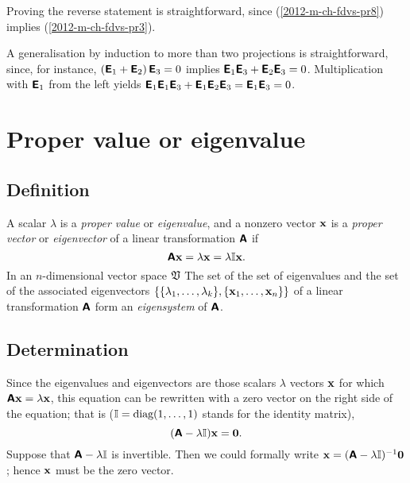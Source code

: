 {Proving the reverse statement is straightforward, since (\ref{2012-m-ch-fdvs-pr8}) implies  (\ref{2012-m-ch-fdvs-pr3}).

A generalisation by induction to more than two projections is straightforward,
since, for instance,
$\left(\textsf{\textbf{E}}_1+\textsf{\textbf{E}}_2\right)\textsf{\textbf{E}}_3=0$
implies
$ \textsf{\textbf{E}}_1\textsf{\textbf{E}}_3+\textsf{\textbf{E}}_2\textsf{\textbf{E}}_3=0$.
Multiplication with $\textsf{\textbf{E}}_1$ from the left yields
$
\textsf{\textbf{E}}_1\textsf{\textbf{E}}_1\textsf{\textbf{E}}_3+\textsf{\textbf{E}}_1\textsf{\textbf{E}}_2\textsf{\textbf{E}}_3=
\textsf{\textbf{E}}_1 \textsf{\textbf{E}}_3=
0$.
 \eproof }


\section{Proper value or eigenvalue}

\subsection{Definition}

A scalar $\lambda$ is a {\em proper value} or {\em eigenvalue},
and a nonzero vector ${\bf x}$ is a {\em proper vector} or {\em eigenvector}
of a linear transformation $\textsf{\textbf{A}}$
if
\begin{equation}
\textsf{\textbf{A}}{\bf x}=   \lambda {\bf x} =   \lambda {\Bbb I} {\bf x}.
\end{equation}
In an $n$-dimensional
vector space $\frak V$
The set of the set of eigenvalues and the set of the associated eigenvectors
$\{\{\lambda_1,\ldots ,\lambda_k\},\{{\bf x}_1,\ldots ,{\bf x}_n\}\}$
of a linear transformation $\textsf{\textbf{A}}$ form an {\em eigensystem} of $\textsf{\textbf{A}}$.

\subsection{Determination}



Since the eigenvalues and eigenvectors are those scalars $\lambda$  vectors ${\bf x}$ for which $\textsf{\textbf{A}}{\bf x}=   \lambda {\bf x}$,
this equation can be rewritten with a zero vector on the right side of the equation; that is (${\Bbb I}=\textrm{diag}(1,\ldots ,1)$ stands for the identity matrix),
\begin{equation}
(\textsf{\textbf{A}} - \lambda {\Bbb I}){\bf x}= {\bf 0}.
\label{2011-m-eve}
\end{equation}
Suppose that $\textsf{\textbf{A}} - \lambda {\Bbb I}$ is invertible. Then we could formally write
${\bf x} = (\textsf{\textbf{A}} - \lambda {\Bbb I})^{-1}{\bf 0}$; hence ${\bf x}$ must be the zero vector.

